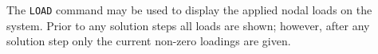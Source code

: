\headb

The {\tt LOAD} command may be used to display the applied nodal loads 
on the system.  Prior to any solution steps all loads are shown;
however, after any solution step only the current non-zero loadings are given.
\vfill
\eject
